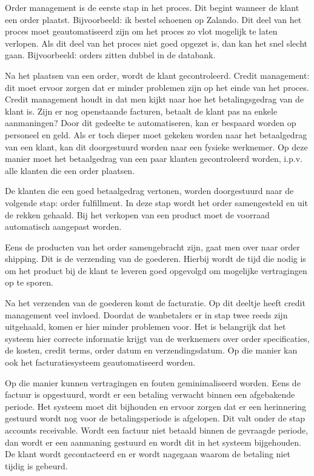 Order management is de eerste stap in het proces. Dit begint wanneer de klant een order plaatst. Bijvoorbeeld: ik bestel schoenen op Zalando. Dit deel van het proces moet geautomatiseerd zijn om het proces zo vlot mogelijk te laten verlopen. Als dit deel van het proces niet goed opgezet  is, dan kan het snel slecht gaan. Bijvoorbeeld: orders zitten dubbel in de databank.

Na het plaatsen van een order, wordt de klant gecontroleerd. Credit management: dit moet ervoor zorgen dat er minder problemen zijn op het einde van het proces. Credit management houdt in dat men kijkt naar hoe het betalingsgedrag van de klant is. Zijn er nog openstaande facturen, betaalt de klant pas na enkele aanmaningen? Door dit gedeelte te automatiseren, kan er bespaard worden op personeel en geld. Als er toch dieper moet gekeken worden naar het betaalgedrag van een klant, kan dit doorgestuurd worden naar een fysieke werknemer. Op deze manier moet het betaalgedrag van een paar klanten gecontroleerd worden, i.p.v. alle klanten die een order plaatsen.
 
De klanten die een goed betaalgedrag vertonen, worden doorgestuurd naar de volgende stap: order fulfillment. In deze stap wordt het order samengesteld en uit de rekken gehaald. Bij het verkopen van een product moet de voorraad automatisch aangepast worden. 

Eens de producten van het order samengebracht zijn, gaat  men  over naar order shipping. Dit is de verzending van de goederen. Hierbij wordt de tijd  die nodig is om het product bij de klant te leveren goed opgevolgd om mogelijke vertragingen op te sporen.  

Na het verzenden van de goederen komt de facturatie. Op dit deeltje heeft credit management veel invloed. Doordat de wanbetalers er in stap twee reeds zijn uitgehaald, komen er hier minder problemen voor. Het is belangrijk dat het systeem hier correcte informatie krijgt van de werknemers over order specificaties, de kosten, credit terms, order datum en verzendingsdatum. Op die manier kan ook het facturatiesysteem geautomatiseerd worden.

 Op die manier kunnen vertragingen en fouten geminimaliseerd worden. Eens de factuur is opgestuurd, wordt er een betaling verwacht binnen een afgebakende periode. Het systeem moet dit bijhouden en ervoor zorgen dat er een herinnering gestuurd wordt nog voor de betalingsperiode is afgelopen. Dit valt onder de stap accounts receivable. 
 Wordt een factuur niet betaald binnen de gevraagde periode, dan wordt er een aanmaning gestuurd en wordt dit in het systeem bijgehouden. De klant wordt gecontacteerd en er wordt nagegaan waarom de betaling niet tijdig is gebeurd.
 
